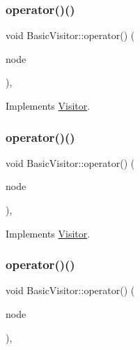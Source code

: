 \subsubsection{\texorpdfstring{operator()()}{operator()()}\hspace{0.1cm}{\footnotesize\ttfamily [14/59]}}
{\footnotesize\ttfamily void Basic\+Visitor\+::operator() (\begin{DoxyParamCaption}\item[{const \hyperlink{struct_object_expression}{Object\+Expression} \&}]{node }\end{DoxyParamCaption})\hspace{0.3cm}{\ttfamily [inline]}, {\ttfamily [virtual]}}



Implements \hyperlink{struct_visitor_a58d0e4e708057211465ba14290a0a154}{Visitor}.

\mbox{\label{struct_basic_visitor_ac9a891133f4ee31a34c0b0584f816e20}} 
\subsubsection{\texorpdfstring{operator()()}{operator()()}\hspace{0.1cm}{\footnotesize\ttfamily [15/59]}}
{\footnotesize\ttfamily void Basic\+Visitor\+::operator() (\begin{DoxyParamCaption}\item[{const \hyperlink{struct_member_expression}{Member\+Expression} \&}]{node }\end{DoxyParamCaption})\hspace{0.3cm}{\ttfamily [inline]}, {\ttfamily [virtual]}}



Implements \hyperlink{struct_visitor_a175fd29619240cc378703de4c357f348}{Visitor}.

\mbox{\label{struct_basic_visitor_a2a571e28c7b4f80b3ec8fabcb00a49c5}} 
\subsubsection{\texorpdfstring{operator()()}{operator()()}\hspace{0.1cm}{\footnotesize\ttfamily [16/59]}}
{\footnotesize\ttfamily void Basic\+Visitor\+::operator() (\begin{DoxyParamCaption}\item[{const \hyperlink{struct_new_expression}{New\+Expression} \&}]{node }\end{DoxyParamCaption})\hspace{0.3cm}{\ttfamily [inline]}, {\ttfamily [virtual]}}



